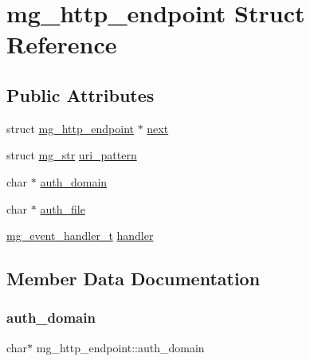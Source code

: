 \hypertarget{structmg__http__endpoint}{}\section{mg\+\_\+http\+\_\+endpoint Struct Reference}
\label{structmg__http__endpoint}
\subsection*{Public Attributes}
\begin{DoxyCompactItemize}
\item 
struct \hyperlink{structmg__http__endpoint}{mg\+\_\+http\+\_\+endpoint} $\ast$ \hyperlink{structmg__http__endpoint_a28fd60f7d7ade3f17130287713340ab7_a28fd60f7d7ade3f17130287713340ab7}{next}
\item 
struct \hyperlink{structmg__str}{mg\+\_\+str} \hyperlink{structmg__http__endpoint_a72024abf72236a0bd7a529182ce78d36_a72024abf72236a0bd7a529182ce78d36}{uri\+\_\+pattern}
\item 
char $\ast$ \hyperlink{structmg__http__endpoint_a19a0e4a59560c9d0b02eaf9d91f50738_a19a0e4a59560c9d0b02eaf9d91f50738}{auth\+\_\+domain}
\item 
char $\ast$ \hyperlink{structmg__http__endpoint_ac54f73eec84df2b4caeb729e9a8fb56e_ac54f73eec84df2b4caeb729e9a8fb56e}{auth\+\_\+file}
\item 
\hyperlink{mongoose_8h_ae5a76da37b3496fcdf561e51648eabda_ae5a76da37b3496fcdf561e51648eabda}{mg\+\_\+event\+\_\+handler\+\_\+t} \hyperlink{structmg__http__endpoint_a24176c5ff8bb9ffb89a8f553e8e066e0_a24176c5ff8bb9ffb89a8f553e8e066e0}{handler}
\end{DoxyCompactItemize}


\subsection{Member Data Documentation}
\mbox{\label{structmg__http__endpoint_a19a0e4a59560c9d0b02eaf9d91f50738_a19a0e4a59560c9d0b02eaf9d91f50738}} 
\subsubsection{\texorpdfstring{auth\+\_\+domain}{auth\_domain}}
{\footnotesize\ttfamily char$\ast$ mg\+\_\+http\+\_\+endpoint\+::auth\+\_\+domain}



